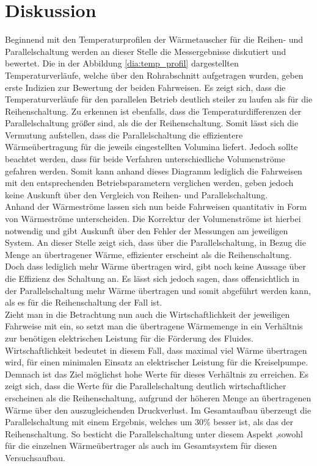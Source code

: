 \section{Diskussion}
\label{sec:diskussion}
Beginnend mit den Temperaturprofilen der Wärmetauscher für die Reihen- und Parallelschaltung werden an dieser Stelle die Messergebnisse diskutiert und bewertet. Die in der Abbildung \ref{dia:temp_profil} dargestellten Temperaturverläufe, welche über den Rohrabschnitt aufgetragen wurden,  geben erste Indizien zur Bewertung der beiden Fahrweisen. Es zeigt sich, dass die Temperaturverläufe für den parallelen Betrieb deutlich steiler zu laufen als für die Reihenschaltung. Zu erkennen ist ebenfalls, dass die Temperaturdifferenzen der Parallelschaltung größer sind, als die der Reihenschaltung. Somit lässt sich die Vermutung aufstellen, dass die Parallelschaltung die effizientere Wärmeübertragung für die jeweils eingestellten Volumina liefert. Jedoch sollte beachtet werden, dass für beide Verfahren unterschiedliche Volumenströme gefahren werden. Somit kann anhand dieses Diagramm lediglich die Fahrweisen mit den entsprechenden Betriebsparametern verglichen werden, geben jedoch keine Auskunft über den Vergleich von Reihen- und Parallelschaltung.\\

Anhand der Wärmeströme lassen sich nun beide Fahrweisen quantitativ in Form von Wärmeströme unterscheiden. Die Korrektur der Volumenströme ist hierbei notwendig und gibt Auskunft über den Fehler der Messungen am jeweiligen System. An dieser Stelle zeigt sich, dass über die Parallelschaltung, in Bezug  die Menge an übertragener Wärme,  effizienter erscheint als die Reihenschaltung. Doch dass lediglich mehr Wärme übertragen wird, gibt noch keine Aussage über die Effizienz des Schaltung an. Es lässt sich jedoch sagen, dass offensichtlich in der Parallelschaltung mehr Wärme übertragen und somit abgeführt werden kann, als es für die Reihenschaltung der Fall ist.\\

Zieht man in die Betrachtung nun auch die Wirtschaftlichkeit der jeweiligen Fahrweise mit ein, so setzt man die übertragene Wärmemenge in ein Verhältnis zur benötigen elektrischen Leistung für die Förderung des Fluides. Wirtschaftlichkeit bedeutet in diesem Fall, dass maximal viel Wärme übertragen wird, für einen minimalen Einsatz an elektrischer Leistung für die Kreiselpumpe. Demnach ist das Ziel möglichst hohe Werte für dieses Verhältnis zu erreichen. Es zeigt sich, dass die Werte für die Parallelschaltung deutlich wirtschaftlicher erscheinen als die Reihenschaltung, aufgrund der höheren Menge an übertragenen Wärme über den auszugleichenden Druckverlust. Im Gesamtaufbau überzeugt die Parallelschaltung mit einem Ergebnis, welches um 30\% besser ist, als das der Reihenschaltung.
So besticht die Parallelschaltung unter diesem Aspekt ,sowohl für die einzelnen Wärmeübertrager als auch im Gesamtsystem für diesen Versuchsaufbau. \\

